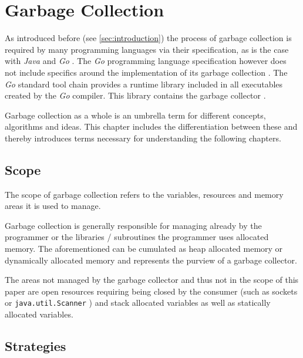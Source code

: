 \section{Garbage Collection}

As introduced before (see \autoref{sec:introduction}) the process of garbage
collection is required by many programming languages via their specification,
as is the case with \textit{Java} \cite[Chapter 1.
Introduction]{java_language_spec_2023} and \textit{Go}
\cite[Introduction]{go_spec_2023}. The \textit{Go} programming language
specification however does not include specifics around the implementation of
its garbage collection \cite[Introduction]{go_gcguide_2022}. The \textit{Go}
standard tool chain provides a runtime library included in all executables
created by the \textit{Go} compiler. This library contains the garbage
collector \cite[Introduction]{go_gcguide_2022}.

Garbage collection as a whole is an umbrella term for
different concepts, algorithms and ideas. This chapter includes the
differentiation between these and thereby introduces terms necessary for
understanding the following chapters. 

\subsection{Scope}

The scope of garbage collection refers to the variables, resources and memory
areas it is used to manage. 

Garbage collection is generally responsible for managing already by the
programmer or the libraries / subroutines the programmer uses allocated memory.
The aforementioned can be cumulated as heap allocated memory or dynamically
allocated memory and represents the purview of a garbage collector.

The areas not managed by the garbage collector and thus not in the scope of
this paper are open resources requiring being closed by the consumer (such as
sockets or \texttt{java.util.Scanner} \cite[close]{java-util-scanner}) and
stack allocated variables as well as statically allocated variables.

\subsection{Strategies}
